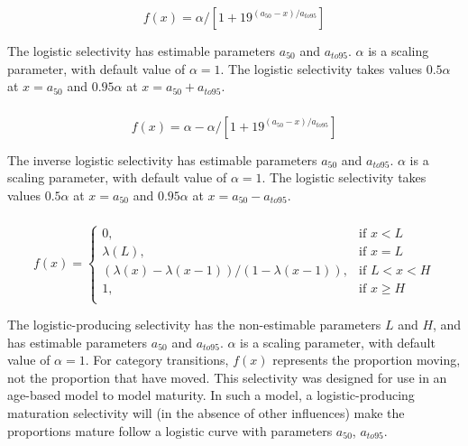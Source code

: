 \begin{equation}
  f(x) = \alpha / [1+19^{(a_{50}-x)/a_{to95}}]
\end{equation}
 
The logistic selectivity has estimable parameters $a_{50}$ and $a_{to95}$. $\alpha$ is a scaling parameter, with default value of $\alpha = 1$. The logistic selectivity takes values $0.5 \alpha$ at $x=a_{50}$ and $0.95 \alpha$ at $x=a_{50}+a_{to95}$. 

\subsubsection[Inverse logistic]{}

\begin{equation}
  f(x) = \alpha - \alpha / [1+19^{(a_{50}-x)/a_{to95}}]
\end{equation}
 
The inverse logistic selectivity has estimable parameters $a_{50}$ and $a_{to95}$. $\alpha$ is a scaling parameter, with default value of $\alpha = 1$. The logistic selectivity takes values $0.5 \alpha$ at $x=a_{50}$ and $0.95 \alpha$ at $x=a_{50}-a_{to95}$. 

\subsubsection[Logistic producing]{}

\begin{equation} 
f(x)=\begin{cases}
	  0, & \text{if $x < L$} \\
	  \lambda(L), & \text{if $x=L$} \\
	  \left( \lambda(x)-\lambda(x-1) \right) / \left( 1-\lambda(x-1) \right), & \text{if $L < x < H$} \\
	  1, & \text{if $x \ge H$} \\  
  \end{cases}
\end{equation}

The logistic-producing selectivity has the non-estimable parameters $L$ and $H$, and has estimable parameters $a_{50}$ and $a_{to95}$. $\alpha$ is a scaling parameter, with default value of $\alpha = 1$. For category transitions, $f(x)$ represents the proportion moving, not the proportion that have moved. This selectivity was designed for use in an age-based model to model maturity. In such a model, a logistic-producing maturation selectivity will (in the absence of other influences) make the proportions mature follow a logistic curve with parameters $a_{50}$, $a_{to95}$.

